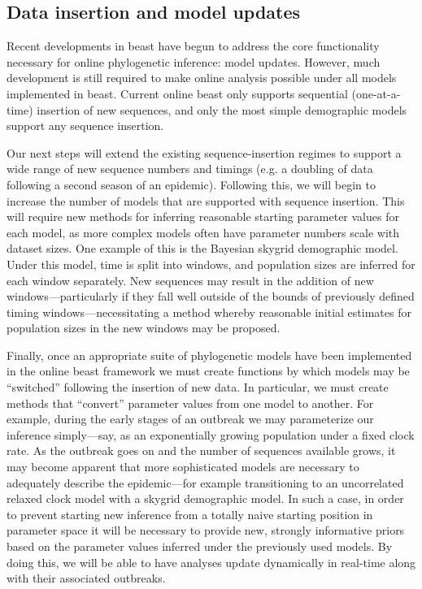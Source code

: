 \subsection{Data insertion and model updates}

Recent developments in \gls{beast} have begun to address the core functionality necessary for online phylogenetic inference: model updates\cite{gill2020online}.
However, much development is still required to make online analysis possible under all models implemented in \gls{beast}.
Current online \gls{beast} only supports sequential (one-at-a-time) insertion of new sequences, and only the most simple demographic models support any sequence insertion.

Our next steps will extend the existing sequence-insertion regimes to support a wide range of new sequence numbers and timings (e.g. a doubling of data following a second season of an epidemic).
Following this, we will begin to increase the number of models that are supported with sequence insertion.
This will require new methods for inferring reasonable starting parameter values for each model, as more complex models often have parameter numbers scale with dataset sizes.
One example of this is the Bayesian skygrid demographic model.
Under this model, time is split into windows, and population sizes are inferred for each window separately.
New sequences may result in the addition of new windows---particularly if they fall well outside of the bounds of previously defined timing windows---necessitating a method whereby reasonable initial estimates for population sizes in the new windows may be proposed.

Finally, once an appropriate suite of phylogenetic models have been implemented in the online \gls{beast} framework we must create functions by which models may be ``switched'' following the insertion of new data.
In particular, we must create methods that ``convert'' parameter values from one model to another.
For example, during the early stages of an outbreak we may parameterize our inference simply---say, as an exponentially growing population under a fixed clock rate.
As the outbreak goes on and the number of sequences available grows, it may become apparent that more sophisticated models are necessary to adequately describe the epidemic---for example transitioning to an uncorrelated relaxed clock model with a skygrid demographic model.
In such a case, in order to prevent starting new inference from a totally naive starting position in parameter space it will be necessary to provide new, strongly informative priors based on the parameter values inferred under the previously used models.
By doing this, we will be able to have analyses update dynamically in real-time along with their associated outbreaks.

